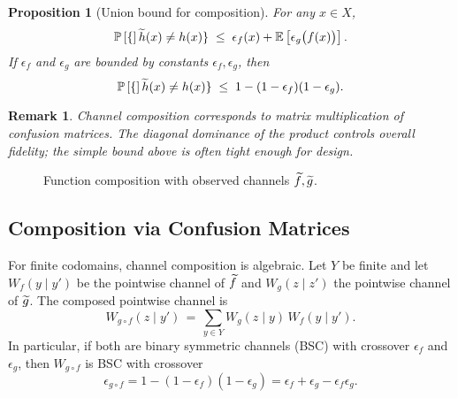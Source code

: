 \documentclass[11pt,final,hidelinks]{article}
\newtheorem{proposition}[theorem]{Proposition}
\newtheorem{remark}[theorem]{Remark}
\newcommand{\error}{\epsilon}
\begin{document}
\begin{proposition}[Union bound for composition]
For any $x\in X$,
\begin{equation}
\Prob\{\obs{h}(x)\neq h(x)\} \;\le\; \error_f(x) + \Expect{\error_g\bigl(f(x)\bigr)}.
\end{equation}
If $\error_f$ and $\error_g$ are bounded by constants $\epsilon_f,\epsilon_g$, then
\begin{equation}
\mathbb{P}\left[\{\right]\widetilde{h}(x)\neq h(x)\} \;\le\; 1-(1-\epsilon_f)(1-\epsilon_g).
\end{equation}
\end{proposition}

\begin{remark}
Channel composition corresponds to matrix multiplication of confusion matrices. The diagonal dominance of the product controls overall fidelity; the simple bound above is often tight enough for design.
\end{remark}

\begin{figure}[t]
\centering
{}
\caption{Function composition with observed channels $\widetilde{f},\widetilde{g}$.}
\end{figure}

\subsection{Composition via Confusion Matrices}

For finite codomains, channel composition is algebraic. Let $Y$ be finite and let $W_f(y\mid y')$ be the pointwise channel of $\widetilde{f}$ and $W_g(z\mid z')$ the pointwise channel of $\widetilde{g}$. The composed pointwise channel is
\begin{equation}
    W_{g\circ f}(z\mid y') \,=\, \sum_{y\in Y} W_g(z\mid y)\,W_f(y\mid y').
\end{equation}
In particular, if both are binary symmetric channels (BSC) with crossover $\epsilon_f$ and $\epsilon_g$, then $W_{g\circ f}$ is BSC with crossover
\begin{equation}
    \epsilon_{g\circ f} = 1-(1-\epsilon_f)(1-\epsilon_g) = \epsilon_f+\epsilon_g-\epsilon_f\epsilon_g.
\end{equation}
\end{document}
